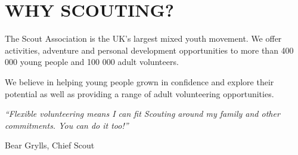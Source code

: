 \documentclass[12pt,foldmark]{leaflet}
\begin{document}
\withrotationtrue
\section{WHY SCOUTING?}
\withrotationfalse
The Scout Association is the UK's largest mixed youth movement. We offer activities, adventure and personal development opportunities to more than 400 000 young people and 100 000 adult volunteers.

We believe in helping young people grown in confidence and explore their potential as well as providing a range of adult volunteering opportunities.
\vfill
\epigraph{\textit{``Flexible volunteering means I can fit Scouting around my family and other commitments. You can do it too!''}}{Bear Grylls, Chief Scout}

\newpage




\end{document}
